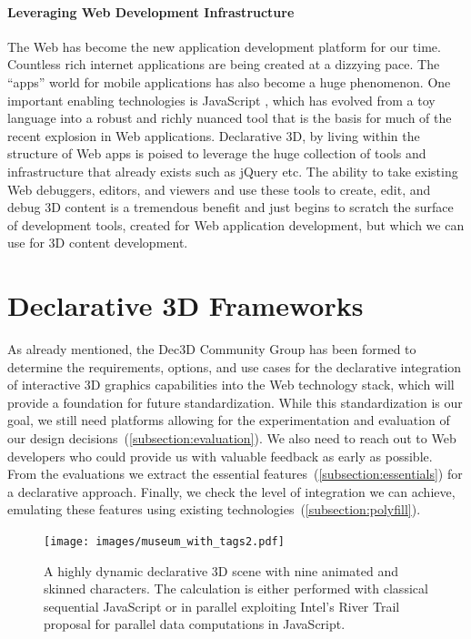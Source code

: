 \documentclass{acmsiggraph}
\begin{document}
\paragraph{Leveraging Web Development Infrastructure}
The Web has become the new application development platform for our time. Countless rich internet applications are being created at a dizzying pace. The ``apps'' world for mobile applications has also become a huge phenomenon. One important enabling technologies is JavaScript \cite{Crockford08}, which has evolved from a toy language into a robust and richly nuanced tool that is the basis for much of the recent explosion in Web applications.
Declarative 3D, by living within the structure of Web apps is poised to leverage the huge collection of tools and infrastructure that already exists such as jQuery \cite{jquery} etc. The ability to take existing Web debuggers, editors, and viewers and use these tools to create, edit, and debug 3D content is a tremendous benefit and just begins to scratch the surface of development tools, created for Web application development, but which we can use for 3D content development.



\section{Declarative 3D Frameworks}
\label{sec:Frameworks}

As already mentioned, the Dec3D Community Group \cite{Dec3D} has been formed to determine the requirements, options, and use cases for the declarative integration of interactive 3D graphics capabilities into the Web technology stack, which will provide a foundation for future standardization. While this standardization is our goal, we still need platforms allowing for the experimentation and evaluation of our design decisions~(\ref{subsection:evaluation}). We also need to reach out to Web developers who could provide us with valuable feedback as early as possible. From the evaluations we extract the essential features~(\ref{subsection:essentials}) for a declarative approach. Finally, we check the level of integration we can achieve, emulating these features using existing technologies~(\ref{subsection:polyfill}).

\begin{figure}
  \centering
  \texttt{[image: images/museum\_with\_tags2.pdf]}
  \caption{A highly dynamic declarative 3D scene with nine animated and skinned characters. The calculation is either performed with classical sequential JavaScript or in parallel exploiting Intel's River Trail proposal for parallel data computations in JavaScript.}
  \label{fig:xflow}
\end{figure}
\end{document}
